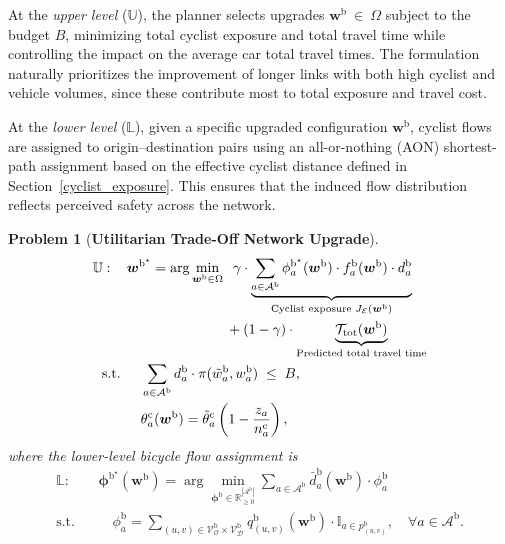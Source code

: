 \documentclass[lettersize,journal]{IEEEtran}
\newtheorem{problem}{\textbf{Problem}}
\begin{document}
At the \textit{upper level} ($\mathbb{U}$), the planner selects upgrades $\boldsymbol{w}^\mathrm{b}~\in~\Omega$ subject to the budget $B$, minimizing total cyclist exposure and total travel time while controlling the impact on the average car total travel times. The formulation naturally prioritizes the improvement of longer links with both high cyclist and vehicle volumes, since these contribute most to total exposure and travel cost.

At the \textit{lower level} ($\mathbb{L}$), given a specific upgraded configuration $\boldsymbol{w}^\mathrm{b}$, cyclist flows are assigned to origin–destination pairs using an all-or-nothing (AON) shortest-path assignment based on the effective cyclist distance defined in Section~\ref{cyclist_exposure}. This ensures that the induced flow distribution reflects perceived safety across the network.
\begin{problem}[\textbf{Utilitarian Trade-Off Network Upgrade}]
\label{trade_off_problem_util}
\begin{align}
\mathbb{U}: \quad  \, &  \boldsymbol{w}^{\mathrm{b}^\star} 
= \arg\min_{\boldsymbol{w}^\mathrm{b} \in \Omega} 
\;\; \gamma \cdot 
\underbrace{\sum_{a \in \mathcal{A}^\mathrm{b}} \phi_{a}^{\mathrm{b}^{\star}}(\boldsymbol{w}^\mathrm{b}) \cdot f_a^\mathrm{b}(\boldsymbol{w}^\mathrm{b}) \cdot d_a^\mathrm{b} }_{\text{Cyclist exposure } J_{\mathcal{E}}(\boldsymbol{w}^\mathrm{b})}
\nonumber \\
& \hspace{2.5cm} + (1-\gamma)\cdot 
\underbrace{\mathcal{T}_{\mathrm{tot}}(\boldsymbol{w}^\mathrm{b})}_{\text{Predicted total travel time}}
\label{eq:upper_util} \\
\text{s.t. } &\quad \sum_{a \in \mathcal{A}^\mathrm{b}} d_a^\mathrm{b} \cdot \pi(\tilde{w}_a^\mathrm{b},w_a^\mathrm{b}) \;\leq\; B, \label{eq:budget_util} \\
&\quad \theta_a^\mathrm{c}(\boldsymbol{w}^\mathrm{b}) 
    = \tilde{\theta}_a^\mathrm{c}
\left(1-\frac{z_a}{n_a^\mathrm{c}}\right), \label{eq:effective_capacity_ut}
\end{align}
where the lower-level bicycle flow assignment is
\begin{align}
\mathbb{L}: \quad \, & 
 \boldsymbol{\phi}^{\mathrm{b}^\star}(\boldsymbol{w}^\mathrm{b}) 
= \arg\min_{\boldsymbol{\phi}^\mathrm{b} \in \mathbb{R}_{\geq 0}^{|\mathcal{A}^\mathrm{b}|}}
\sum_{a \in \mathcal{A}^\mathrm{b}} \bar{d}_a^\mathrm{b}(\boldsymbol{w}^\mathrm{b}) \cdot \phi_a^\mathrm{b}
\label{eq:lower_util} \\
\text{s.t. } &\quad \phi_a^\mathrm{b} = \sum_{(u,v) \in \mathcal{V}^\mathrm{b}_\mathcal{O} \times \mathcal{V}^\mathrm{b}_\mathcal{D}}
q_{(u,v)}^\mathrm{b}(\boldsymbol{w}^\mathrm{b}) \cdot \mathbb{I}_{a \in p_{(u,v)}^\mathrm{b}}, \quad \forall a \in \mathcal{A}^\mathrm{b}. \nonumber
\end{align}
\end{problem}
\end{document}
